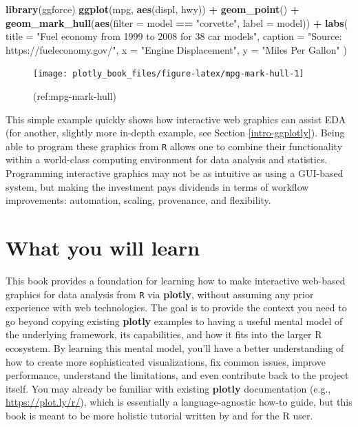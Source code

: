 \documentclass[
  12pt,
]{krantz}
\newenvironment{Shaded}{\begin{snugshade}}{\end{snugshade}}
\newcommand{\DataTypeTok}[1]{\textcolor[rgb]{0.13,0.29,0.53}{#1}}
\newcommand{\KeywordTok}[1]{\textcolor[rgb]{0.13,0.29,0.53}{\textbf{#1}}}
\newcommand{\NormalTok}[1]{#1}
\newcommand{\OperatorTok}[1]{\textcolor[rgb]{0.81,0.36,0.00}{\textbf{#1}}}
\newcommand{\StringTok}[1]{\textcolor[rgb]{0.31,0.60,0.02}{#1}}
\begin{document}
\begin{Shaded}
\begin{Highlighting}[]
\KeywordTok{library}\NormalTok{(ggforce)}
\KeywordTok{ggplot}\NormalTok{(mpg, }\KeywordTok{aes}\NormalTok{(displ, hwy)) }\OperatorTok{+}\StringTok{ }
\StringTok{  }\KeywordTok{geom_point}\NormalTok{() }\OperatorTok{+}
\StringTok{  }\KeywordTok{geom_mark_hull}\NormalTok{(}\KeywordTok{aes}\NormalTok{(}\DataTypeTok{filter =}\NormalTok{ model }\OperatorTok{==}\StringTok{ "corvette"}\NormalTok{, }\DataTypeTok{label =}\NormalTok{ model)) }\OperatorTok{+}
\StringTok{  }\KeywordTok{labs}\NormalTok{(}
    \DataTypeTok{title =} \StringTok{"Fuel economy from 1999 to 2008 for 38 car models"}\NormalTok{,}
    \DataTypeTok{caption =} \StringTok{"Source: https://fueleconomy.gov/"}\NormalTok{,}
    \DataTypeTok{x =} \StringTok{"Engine Displacement"}\NormalTok{, }
    \DataTypeTok{y =} \StringTok{"Miles Per Gallon"}
\NormalTok{  )}
\end{Highlighting}
\end{Shaded}

\begin{figure}

{\centering \texttt{[image: plotly\_book\_files/figure-latex/mpg-mark-hull-1]} 

}

\caption{(ref:mpg-mark-hull)}\label{fig:mpg-mark-hull}
\end{figure}

This simple example quickly shows how interactive web graphics can assist EDA (for another, slightly more in-depth example, see Section \ref{intro-ggplotly}). Being able to program these graphics from \texttt{R} allows one to combine their functionality within a world-class computing environment for data analysis and statistics. Programming interactive graphics may not be as intuitive as using a GUI-based system, but making the investment pays dividends in terms of workflow improvements: automation, scaling, provenance, and flexibility.

\hypertarget{what-you-will-learn}{%
\section{What you will learn}\label{what-you-will-learn}}

This book provides a foundation for learning how to make interactive web-based graphics for data analysis from \texttt{R} via \textbf{plotly}, without assuming any prior experience with web technologies. The goal is to provide the context you need to go beyond copying existing \textbf{plotly} examples to having a useful mental model of the underlying framework, its capabilities, and how it fits into the larger R ecosystem. By learning this mental model, you'll have a better understanding of how to create more sophisticated visualizations, fix common issues, improve performance, understand the limitations, and even contribute back to the project itself. You may already be familiar with existing \textbf{plotly} documentation (e.g., \url{https://plot.ly/r/}), which is essentially a language-agnostic how-to guide, but this book is meant to be more holistic tutorial written by and for the R user.
\end{document}
